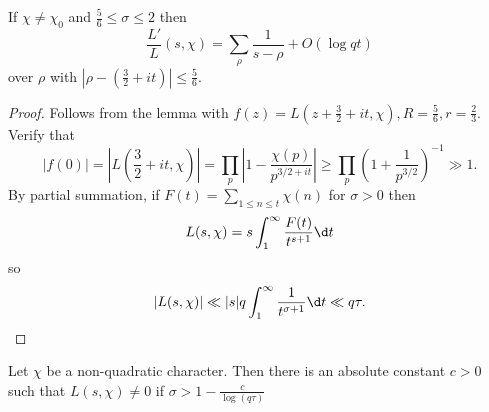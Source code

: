 \documentclass[a4paper]{article}
\theoremstyle{definition}
\begin{document}
\begin{lemma}
  If \(\chi \neq \chi_0\) and \(\frac{5}{6} \leq \sigma \leq 2\) then
  \[
    \frac{L'}{L}(s, \chi) = \sum_\rho \frac{1}{s - \rho} + O(\log qt)
  \]
  over \(\rho\) with \(|\rho - (\frac{3}{2} + it)| \leq \frac{5}{6}\).
\end{lemma}

\begin{proof}
  Follows from the lemma with \(f(z) = L(z + \frac{3}{2} + it, \chi), R = \frac{5}{6}, r = \frac{2}{3}\). Verify that
  \[
    |f(0)|
    = |L(\frac{3}{2} + it, \chi)|
    = \prod_p \left| 1 - \frac{\chi(p)}{p^{3/2 + it}} \right|
    \geq \prod_p \left( 1+ \frac{1}{p^{3/2}} \right)^{-1}
    \gg 1.
  \]
  By partial summation, if \(F(t) = \sum_{1 \leq n \leq t} \chi(n)\) for \(\sigma > 0\) then
  \[
    L(s, \chi) = s\int_1^\infty \frac{F(t)}{t^{s + 1}} \d t
  \]
  so
  \[
    |L(s, \chi)|
    \ll |s| q \int_1^\infty \frac{1}{t^{\sigma + 1}} \d t
    \ll q \tau.
  \]
\end{proof}

\begin{theorem}
  Let \(\chi\) be a non-quadratic character. Then there is an absolute constant \(c > 0\)  such that \(L(s, \chi) \neq 0\) if \(\sigma > 1 - \frac{c}{\log (q\tau)}\)
\end{theorem}
\end{document}
